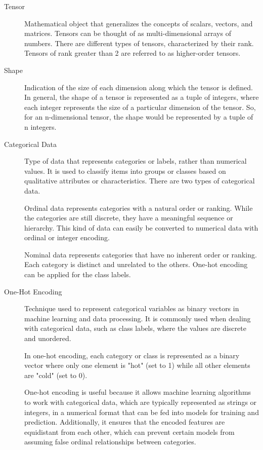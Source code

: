 \documentclass[a4paper]{report}
\begin{document}
\begin{description}
\item[Tensor]
Mathematical object that generalizes the concepts of scalars, vectors, and matrices. Tensors can be thought of as multi-dimensional arrays of numbers. There are different types of tensors, characterized by their rank. Tensors of rank greater than 2 are referred to as higher-order tensors. 

\item[Shape]
Indication of the size of each dimension along which the tensor is defined. In general, the shape of a tensor is represented as a tuple of integers, where each integer represents the size of a particular dimension of the tensor. So, for an n-dimensional tensor, the shape would be represented by a tuple of n integers.

\item[Categorical Data]
Type of data that represents categories or labels, rather than numerical values. It is used to classify items into groups or classes based on qualitative attributes or characteristics. There are two types of categorical data.

Ordinal data represents categories with a natural order or ranking. While the categories are still discrete, they have a meaningful sequence or hierarchy. This kind of data can easily be converted to numerical data with ordinal or integer encoding.

Nominal data represents categories that have no inherent order or ranking. Each category is distinct and unrelated to the others. One-hot encoding can be applied for the class labels. 

\item[One-Hot Encoding]
Technique used to represent categorical variables as binary vectors in machine learning and data processing. It is commonly used when dealing with categorical data, such as class labels, where the values are discrete and unordered.

In one-hot encoding, each category or class is represented as a binary vector where only one element is "hot" (set to 1) while all other elements are "cold" (set to 0). 

One-hot encoding is useful because it allows machine learning algorithms to work with categorical data, which are typically represented as strings or integers, in a numerical format that can be fed into models for training and prediction. Additionally, it ensures that the encoded features are equidistant from each other, which can prevent certain models from assuming false ordinal relationships between categories.


\end{description}
\end{document}
